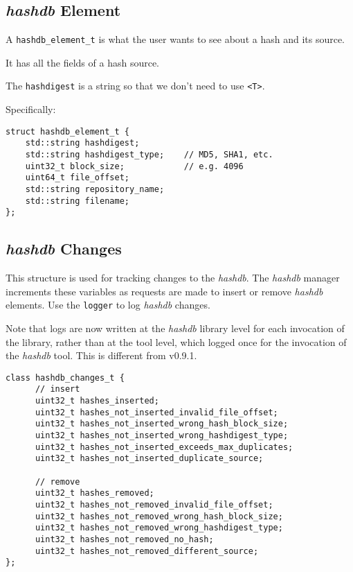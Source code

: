 \documentclass[12pt,twoside]{article}
\newcommand{\hdb}{\emph{hashdb}\xspace}
\begin{document}
\subsection{\hdb Element}
A \texttt{hashdb\_element\_t} is what the user wants to see
about a hash and its source.
\begin{compactitem}
\item It has all the fields of a hash source.
\item The \texttt{hashdigest} is a string so that we don't need to use
\texttt{<T>}.
\end{compactitem}

Specifically:
\begin{small}
\begin{verbatim}
struct hashdb_element_t {
    std::string hashdigest;
    std::string hashdigest_type;    // MD5, SHA1, etc.
    uint32_t block_size;            // e.g. 4096
    uint64_t file_offset;
    std::string repository_name;
    std::string filename;
};
\end{verbatim}
\end{small}

\subsection{\hdb Changes}
This structure is used for tracking changes to the \hdb.
The \hdb manager increments these variables
as requests are made to insert or remove \hdb elements.
Use the \texttt{logger} to log \hdb changes.

Note that logs are now written at the \hdb library level
for each invocation of the library,
rather than at the tool level, which logged once
for the invocation of the \hdb tool.
This is different from v0.9.1.

\begin{small}
\begin{verbatim}
class hashdb_changes_t {
      // insert
      uint32_t hashes_inserted;
      uint32_t hashes_not_inserted_invalid_file_offset;
      uint32_t hashes_not_inserted_wrong_hash_block_size;
      uint32_t hashes_not_inserted_wrong_hashdigest_type;
      uint32_t hashes_not_inserted_exceeds_max_duplicates;
      uint32_t hashes_not_inserted_duplicate_source;

      // remove
      uint32_t hashes_removed;
      uint32_t hashes_not_removed_invalid_file_offset;
      uint32_t hashes_not_removed_wrong_hash_block_size;
      uint32_t hashes_not_removed_wrong_hashdigest_type;
      uint32_t hashes_not_removed_no_hash;
      uint32_t hashes_not_removed_different_source;
};
\end{verbatim}
\end{small}
\end{document}
